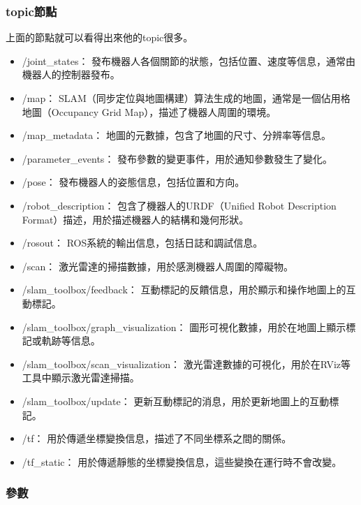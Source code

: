 \subsubsection{topic節點}
上面的節點就可以看得出來他的topic很多。

\begin{itemize}
    \item /joint\_states： 發布機器人各個關節的狀態，包括位置、速度等信息，通常由機器人的控制器發布。
    \item /map： SLAM（同步定位與地圖構建）算法生成的地圖，通常是一個佔用格地圖（Occupancy Grid Map），描述了機器人周圍的環境。
    \item /map\_metadata： 地圖的元數據，包含了地圖的尺寸、分辨率等信息。
    \item /parameter\_events： 發布參數的變更事件，用於通知參數發生了變化。
    \item /pose： 發布機器人的姿態信息，包括位置和方向。
    \item /robot\_description： 包含了機器人的URDF（Unified Robot Description Format）描述，用於描述機器人的結構和幾何形狀。
    \item /rosout： ROS系統的輸出信息，包括日誌和調試信息。
    \item /scan： 激光雷達的掃描數據，用於感測機器人周圍的障礙物。
    \item /slam\_toolbox/feedback： 互動標記的反饋信息，用於顯示和操作地圖上的互動標記。
    \item /slam\_toolbox/graph\_visualization： 圖形可視化數據，用於在地圖上顯示標記或軌跡等信息。
    \item /slam\_toolbox/scan\_visualization： 激光雷達數據的可視化，用於在RViz等工具中顯示激光雷達掃描。
    \item /slam\_toolbox/update： 更新互動標記的消息，用於更新地圖上的互動標記。
    \item /tf： 用於傳遞坐標變換信息，描述了不同坐標系之間的關係。
    \item /tf\_static： 用於傳遞靜態的坐標變換信息，這些變換在運行時不會改變。
\end{itemize}

\subsubsection{參數}

